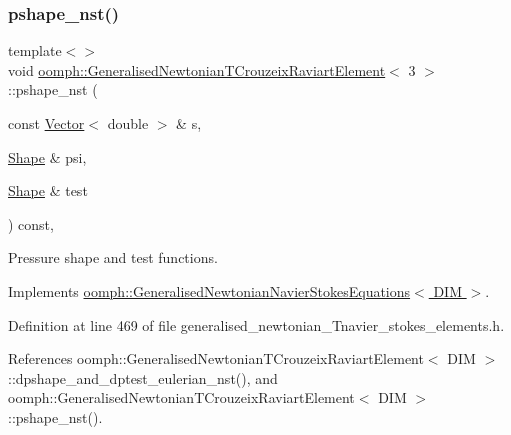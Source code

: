 \mbox{\label{classoomph_1_1GeneralisedNewtonianTCrouzeixRaviartElement_a2fb667e5e88e526f2ff3fc9077488c2e}} 
\subsubsection{\texorpdfstring{pshape\+\_\+nst()}{pshape\_nst()}\hspace{0.1cm}{\footnotesize\ttfamily [6/6]}}
{\footnotesize\ttfamily template$<$$>$ \\
void \hyperlink{classoomph_1_1GeneralisedNewtonianTCrouzeixRaviartElement}{oomph\+::\+Generalised\+Newtonian\+T\+Crouzeix\+Raviart\+Element}$<$ 3 $>$\+::pshape\+\_\+nst (\begin{DoxyParamCaption}\item[{const \hyperlink{classoomph_1_1Vector}{Vector}$<$ double $>$ \&}]{s,  }\item[{\hyperlink{classoomph_1_1Shape}{Shape} \&}]{psi,  }\item[{\hyperlink{classoomph_1_1Shape}{Shape} \&}]{test }\end{DoxyParamCaption}) const\hspace{0.3cm}{\ttfamily [inline]}, {\ttfamily [virtual]}}



Pressure shape and test functions. 



Implements \hyperlink{classoomph_1_1GeneralisedNewtonianNavierStokesEquations_afb01a54f377b1bebe141ed8e11ced138}{oomph\+::\+Generalised\+Newtonian\+Navier\+Stokes\+Equations$<$ D\+I\+M $>$}.



Definition at line 469 of file generalised\+\_\+newtonian\+\_\+\+Tnavier\+\_\+stokes\+\_\+elements.\+h.



References oomph\+::\+Generalised\+Newtonian\+T\+Crouzeix\+Raviart\+Element$<$ D\+I\+M $>$\+::dpshape\+\_\+and\+\_\+dptest\+\_\+eulerian\+\_\+nst(), and oomph\+::\+Generalised\+Newtonian\+T\+Crouzeix\+Raviart\+Element$<$ D\+I\+M $>$\+::pshape\+\_\+nst().

